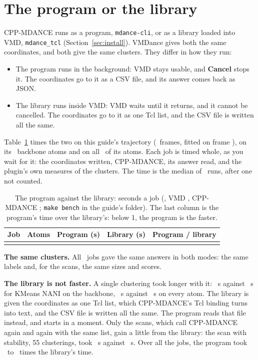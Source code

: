 \documentclass[11pt,letterpaper]{article}
\newcommand{\ui}[1]{\textsf{\textbf{#1}}}
\newcommand{\cmd}[1]{\texttt{#1}}
\begin{document}
\section{The program or the library}
\label{sec:bench}

CPP-MDANCE runs as a program, \cmd{mdance-cli}, or as a library loaded into
VMD, \cmd{mdance\_tcl} (Section~\ref{sec:install}). VMDance gives both the
same coordinates, and both give the same clusters. They differ in how they
run:

\begin{itemize}
  \item The program runs in the background: VMD stays usable, and \ui{Cancel}
    stops it. The coordinates go to it as a CSV file, and its answer comes
    back as JSON.
  \item The library runs inside VMD: VMD waits until it returns, and it cannot
    be cancelled. The coordinates go to it as one Tcl list, and the CSV file
    is written all the same.
\end{itemize}

Table~\ref{tab:bench} times the two on this guide's trajectory (\bnFrames\
frames, fitted on frame \bnFitFrame), on its \bnAtomsBackbone\ backbone atoms
and on all \bnAtomsAll\ of its atoms. Each job is timed whole, as you wait
for it: the coordinates written, CPP-MDANCE, its answer read, and the
plugin's own measures of the clusters. The time is the median of \bnReps\
runs, after one not counted.

\begin{table}[H]
\centering
\small
\caption{The program against the library: seconds a job (\bnMachine, VMD
  \qsVMD, CPP-MDANCE \qsBackendCommit; \cmd{make bench} in the guide's
  folder). The last column is the program's time over the library's: below
  1, the program is the faster.}
\label{tab:bench}
\begin{tabular}{@{}lrrrr@{}}
\toprule
Job & Atoms & Program (s) & Library (s) & Program / library \\
\midrule
\bnRows \\
\bottomrule
\end{tabular}
\end{table}

\textbf{The same clusters.} All \bnCompared\ jobs gave the same answers in
both modes: the same labels and, for the scans, the same sizes and scores.

\textbf{The library is not faster.} A single clustering took longer with it:
\bnKmeansLib\ s against \bnKmeansCli\ s for KMeans NANI on the backbone,
\bnKmeansAllLib\ s against \bnKmeansAllCli\ s on every atom. The library is
given the coordinates as one Tcl list, which CPP-MDANCE's Tcl binding turns
into text, and the CSV file is written all the same. The program reads that
file instead, and starts in a moment. Only the scans, which call CPP-MDANCE
again and again with the same list, gain a little from the library: the scan
with stability, 55 clusterings, took \bnStabilityLib\ s against
\bnStabilityCli\ s. Over all the jobs, the program took \bnGainMin\ to
\bnGainMax\ times the library's time.
\end{document}
